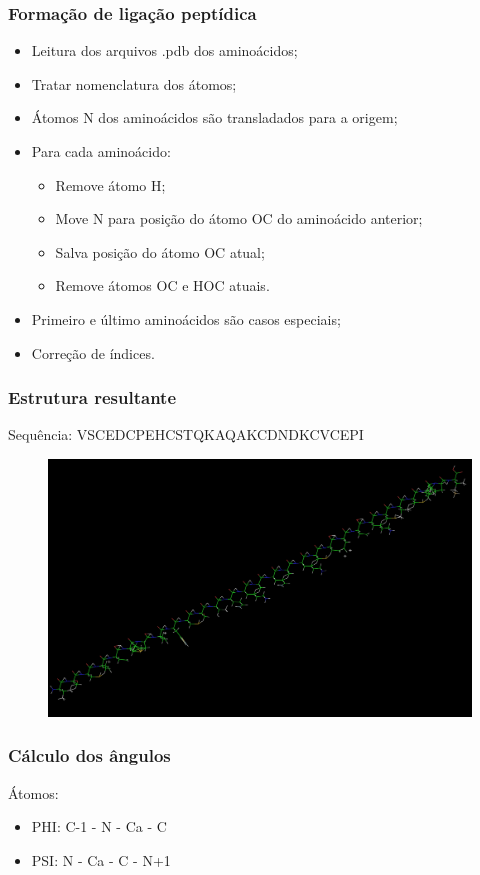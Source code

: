\documentclass{beamer}
\begin{document}
\begin{frame}
\frametitle{Formação de ligação peptídica}
\begin{itemize}
\item Leitura dos arquivos .pdb dos aminoácidos;
\item Tratar nomenclatura dos átomos;
\item Átomos N dos aminoácidos são transladados para a origem;
\item Para cada aminoácido:
\begin{itemize}
 \item Remove átomo H;
 \item Move N para posição do átomo OC do aminoácido anterior;
 \item Salva posição do átomo OC atual;
 \item Remove átomos OC e HOC atuais.
\end{itemize}
\item Primeiro e último aminoácidos são casos especiais;
\item Correção de índices.
\end{itemize}
\end{frame}

\begin{frame}
\frametitle{Estrutura resultante}
Sequência: VSCEDCPEHCSTQKAQAKCDNDKCVCEPI
\begin{figure}
\includegraphics[width=0.8\linewidth]{protein.png}
\end{figure}
\end{frame}

\begin{frame}
\frametitle{Cálculo dos ângulos}
Átomos:
\begin{itemize}
\item PHI: C-1 - N - Ca - C
\item PSI: N - Ca - C - N+1
\end{itemize}
\end{frame}
\end{document}
